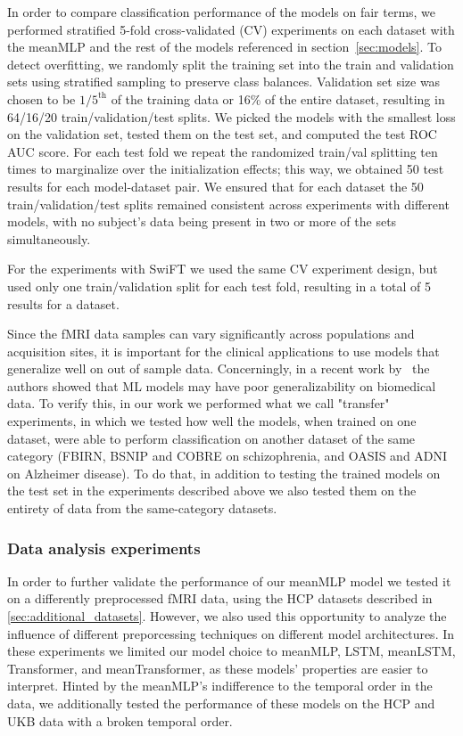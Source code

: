 \documentclass[final,5p,times,twocolumn,authoryear]{elsarticle}
\begin{document}
In order to compare classification performance of the models on fair terms, we performed stratified 5-fold cross-validated (CV) experiments on each dataset with the meanMLP and the rest of the models referenced in section~\ref{sec:models}.
To detect overfitting, we randomly split the training set into the train and validation sets using stratified sampling to preserve class balances.
Validation set size was chosen to be $1/5^\text{th}$ of the training
data or 16\% of the entire dataset, resulting in 64/16/20
train/validation/test splits. 
We picked the models with the smallest loss on the validation set, tested them on the test set, and computed the test ROC AUC score. 
For each test fold we repeat the randomized train/val splitting ten times to marginalize over the initialization effects; this way, we obtained 50 test results for each model-dataset pair. 
We ensured that for each dataset the 50 train/validation/test splits remained consistent across experiments with different models, with no subject's data being present in two or more of the sets simultaneously.

For the experiments with SwiFT we used the same CV experiment design, but used only one train/validation split for each test fold, resulting in a total of 5 results for a dataset.

Since the fMRI data samples can vary significantly across populations
and acquisition sites, it is important for the clinical applications
to use models that generalize well on out of sample data. Concerningly, in a recent work by~\citet{transfer_debunk} the authors showed that ML models may have poor generalizability on biomedical data. To verify this, in our work we performed what we call "transfer" experiments, in which we tested how well the models, when trained on one dataset, were able to perform classification on another dataset of the same category (FBIRN, BSNIP and COBRE on schizophrenia, and OASIS and ADNI on Alzheimer disease). To do that, in addition to testing the trained models on the test set in the experiments described above we also tested them on the entirety of data from the same-category datasets.


\subsubsection{Data analysis experiments}\label{sec:fmri_analysis}
In order to further validate the performance of our meanMLP model we tested it on a differently preprocessed fMRI data, using the HCP datasets described in \ref{sec:additional_datasets}. However, we also used this opportunity to analyze the influence of different preporcessing techniques on different model architectures. In these experiments we limited our model choice to meanMLP, LSTM, meanLSTM, Transformer, and meanTransformer, as these models’ properties are easier to interpret. Hinted by the meanMLP's indifference to the temporal order in the data, we additionally tested the performance of these models on the HCP and UKB data with a broken temporal order. 
\end{document}
